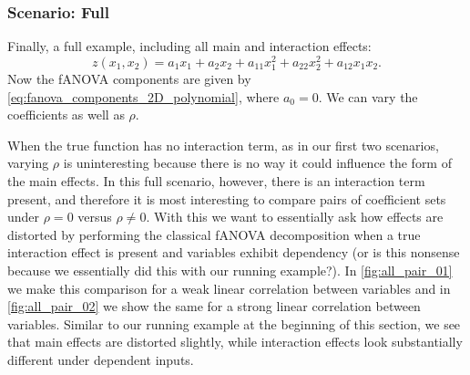 \subsubsection{Scenario: Full}
Finally, a full example, including all main and interaction effects:
$$z(x_1, x_2) = a_1 x_1 + a_2 x_2 + a_{11} x_1^2 + a_{22} x_2^2 + a_{12} x_1 x_2.$$
Now the fANOVA components are given by \autoref{eq:fanova_components_2D_polynomial}, where $a_0 = 0$.
We can vary the coefficients as well as $\rho$.\par
When the true function has no interaction term, as in our first two scenarios, varying $\rho$ is uninteresting because there is no way it could influence the form of the main effects. In this full scenario, however, there is an interaction term present, and therefore it is most interesting to compare pairs of coefficient sets under $\rho = 0$ versus $\rho \neq 0$. With this we want to essentially ask how effects are distorted by performing the classical fANOVA decomposition when a true interaction effect is present and variables exhibit dependency (or is this nonsense because we essentially did this with our running example?).
In \autoref{fig:all_pair_01} we make this comparison for a weak linear correlation between variables and in \autoref{fig:all_pair_02} we show the same for a strong linear correlation between variables. Similar to our running example at the beginning of this section, we see that main effects are distorted slightly, while interaction effects look substantially different under dependent inputs.

